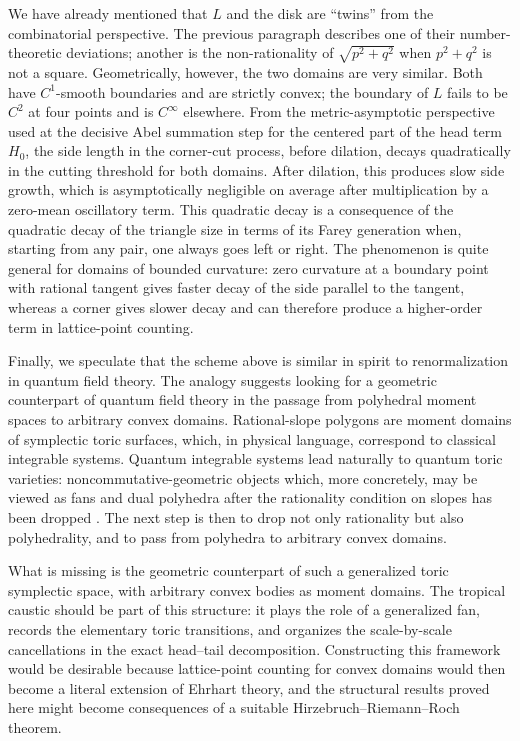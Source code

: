 \documentclass[a4paper,american,11pt]{amsart}
\theoremstyle{plain}
\theoremstyle{definition}
\begin{document}
We have already mentioned that \(L\) and the disk are ``twins'' from the
combinatorial perspective. The previous paragraph describes one of their
number-theoretic deviations; another is the non-rationality of
\(\sqrt{p^2+q^2}\) when \(p^2+q^2\) is not a square. Geometrically, however,
the two domains are very similar. Both have \(C^1\)-smooth boundaries and are strictly convex; the boundary of
\(L\) fails to be \(C^2\) at four points and is \(C^\infty\) elsewhere. From the metric-asymptotic perspective used at the
decisive Abel summation step for the centered part of the head term \(H_0\),
the side length in the corner-cut process, before dilation, decays quadratically
in the cutting threshold for both domains. After dilation, this produces slow
side growth, which is asymptotically negligible on average after multiplication
by a zero-mean oscillatory term. This quadratic decay is a consequence of the
quadratic decay of the triangle size in terms of its Farey generation when,
starting from any pair, one always goes left or right. The phenomenon is quite
general for domains of bounded curvature: zero curvature at a boundary point
with rational tangent gives faster decay of the side parallel to the tangent,
whereas a corner gives slower decay and can therefore produce a higher-order
term in lattice-point counting.

Finally, we speculate that the scheme above is similar in spirit to
renormalization in quantum field theory.  The analogy suggests
looking for a geometric counterpart of quantum field theory in the passage
from polyhedral moment spaces to arbitrary convex domains.  Rational-slope
polygons are moment domains of symplectic toric surfaces, which, in physical
language, correspond to classical integrable systems.  Quantum integrable
systems lead naturally to quantum toric varieties: noncommutative-geometric
objects which, more concretely, may be viewed as fans and dual polyhedra
after the rationality condition on slopes has been dropped
\cite{KatzarkovLupercioMeerssemanVerjovsky2014NC,katzarkov2021quantum,KatzarkovLeeLupercioMeersseman2025Hodge}.
The next step is then to drop not only rationality but also polyhedrality,
and to pass from polyhedra to arbitrary convex domains.

What is missing is the geometric counterpart of such a generalized toric
symplectic space, with arbitrary convex bodies as moment domains.  The
tropical caustic should be part of this structure: it plays the role of a
generalized fan, records the elementary toric transitions, and organizes the
scale-by-scale cancellations in the exact head--tail decomposition.  Constructing this
framework would be desirable because lattice-point counting for convex
domains would then become a literal extension of Ehrhart theory, and the
structural results proved here might become consequences of a suitable
Hirzebruch--Riemann--Roch theorem. 
\end{document}
